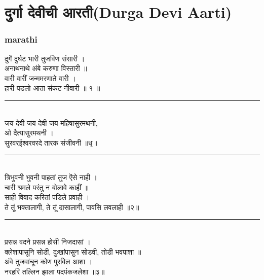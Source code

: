 \documentclass[letterpaper,twocolumn,openany,nodeprecatedcode]{dndbook}
\begin{document}
\chapter{दुर्गा देवीची आरती(Durga Devi Aarti)}
\begin{flushleft}
  \subsection*{marathi}
  दुर्गे दुर्घट भारी तुजविण संसारी । \\
  अनाथनाथे अंबे करुणा विस्तारी ॥\\
  वारी वारीं जन्ममरणाते वारी । \\
  हारी पडलो आता संकट नीवारी ॥ १ ॥ \\
  \rule{\linewidth}{1pt} \\
  जय देवी जय देवी जय महिषासुरमथनी, \\ ओ दैत्यासुरमथनी । \\
  सुरवरईश्वरवरदे तारक संजीवनी ॥धृ॥ \\
  \rule{\linewidth}{1pt} \\
  त्रिभुवनी भुवनी पाहतां तुज ऎसे नाही । \\
  चारी श्रमले परंतु न बोलावे काहीं ॥ \\
  साही विवाद करितां पडिले प्रवाही । \\
  ते तूं भक्तालागी, ते तूं दासालागी, पावसि लवलाही ॥२॥ \\
  \rule{\linewidth}{1pt} \\
  प्रसन्न वदने प्रसन्न होसी निजदासां । \\
  क्लेशापासूनि सोडी, दुःखांपासुन सोडवी, तोडी भवपाशा ॥ \\
  अंवे तुजवांचून कोण पुरविल आशा । \\
  नरहरि तल्लिन झाला पदपंकजलेशा ॥३॥ \\
  \pagebreak

\end{flushleft}
\end{document}

